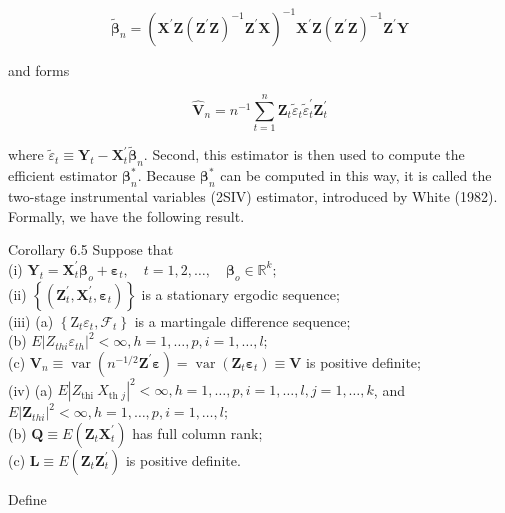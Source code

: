 \documentclass[10pt]{article}
\begin{document}
$$
\tilde{\boldsymbol{\beta}}_{n}=\left(\mathbf{X}^{\prime} \mathbf{Z}\left(\mathbf{Z}^{\prime} \mathbf{Z}\right)^{-1} \mathbf{Z}^{\prime} \mathbf{X}\right)^{-1} \mathbf{X}^{\prime} \mathbf{Z}\left(\mathbf{Z}^{\prime} \mathbf{Z}\right)^{-1} \mathbf{Z}^{\prime} \mathbf{Y}
$$

and forms

$$
\hat{\mathbf{V}}_{n}=n^{-1} \sum_{t=1}^{n} \mathbf{Z}_{t} \tilde{\varepsilon}_{t} \tilde{\varepsilon}_{t}^{\prime} \mathbf{Z}_{t}^{\prime}
$$

where $\tilde{\varepsilon}_{t} \equiv \mathbf{Y}_{t}-\mathbf{X}_{t}^{\prime} \tilde{\boldsymbol{\beta}}_{n}$. Second, this estimator is then used to compute the efficient estimator $\boldsymbol{\beta}_{n}^{*}$. Because $\boldsymbol{\beta}_{n}^{*}$ can be computed in this way, it is called the two-stage instrumental variables (2SIV) estimator, introduced by White (1982). Formally, we have the following result.

Corollary 6.5 Suppose that\\
(i) $\mathbf{Y}_{t}=\mathbf{X}_{t}^{\prime} \boldsymbol{\beta}_{o}+\boldsymbol{\varepsilon}_{t}, \quad t=1,2, \ldots, \quad \boldsymbol{\beta}_{o} \in \mathbb{R}^{k} ;$\\
(ii) $\left\{\left(\mathbf{Z}_{t}^{\prime}, \mathbf{X}_{t}^{\prime}, \boldsymbol{\varepsilon}_{t}\right)\right\}$ is a stationary ergodic sequence;\\
(iii) (a) $\left\{\mathrm{Z}_{t} \varepsilon_{t}, \mathcal{F}_{t}\right\}$ is a martingale difference sequence;\\
(b) $E\left|Z_{t h i} \varepsilon_{t h}\right|^{2}<\infty, h=1, \ldots, p, i=1, \ldots, l$;\\
(c) $\mathbf{V}_{n} \equiv \operatorname{var}\left(n^{-1 / 2} \mathbf{Z}^{\prime} \boldsymbol{\varepsilon}\right)=\operatorname{var}\left(\mathbf{Z}_{t} \boldsymbol{\varepsilon}_{t}\right) \equiv \mathbf{V}$ is positive definite;\\
(iv) (a) $E\left|Z_{\text {thi }} X_{\text {th } j}\right|^{2}<\infty, h=1, \ldots, p, i=1, \ldots, l, j=1, \ldots, k$, and $E\left|\mathbf{Z}_{t h i}\right|^{2}<\infty, h=1, \ldots, p, i=1, \ldots, l ;$\\
(b) $\mathbf{Q} \equiv E\left(\mathbf{Z}_{t} \mathbf{X}_{t}^{\prime}\right)$ has full column rank;\\
(c) $\mathbf{L} \equiv E\left(\mathbf{Z}_{t} \mathbf{Z}_{t}^{\prime}\right)$ is positive definite.

Define
\end{document}
